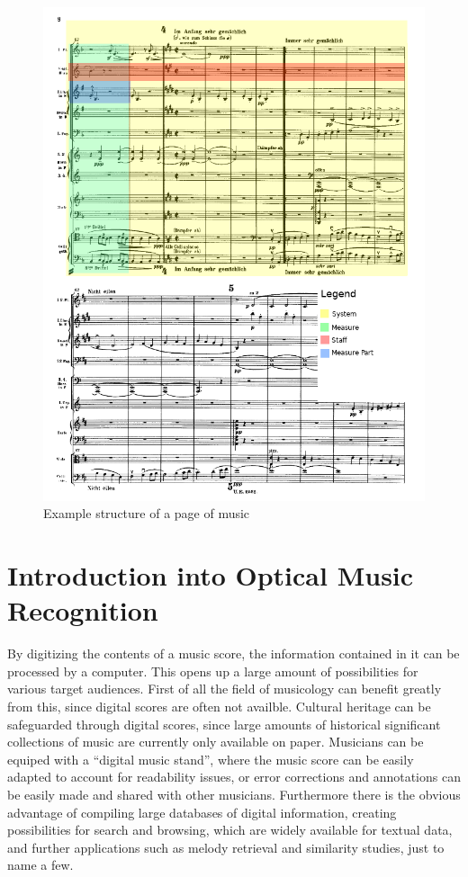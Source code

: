 \begin{figure}
    \includegraphics[width=\textwidth]{images/score-structure.png}
    \centering
    \caption{Example structure of a page of music}
    \label{fig:page-structure}
\end{figure}

\section{Introduction into Optical Music Recognition}\label{sec:introduction-OMR}
By digitizing the contents of a music score, the information contained in it can be processed by a computer. This opens up a large amount of possibilities for various target audiences. First of all the field of musicology can benefit greatly from this, since digital scores are often not availble. Cultural heritage can be safeguarded through digital scores, since large amounts of historical significant collections of music are currently only available on paper. Musicians can be equiped with a ``digital music stand'', where the music score can be easily adapted to account for readability issues, or error corrections and annotations can be easily made and shared with other musicians. Furthermore there is the obvious advantage of compiling large databases of digital information, creating possibilities for search and browsing, which are widely available for textual data, and further applications such as melody retrieval and similarity studies, just to name a few.

